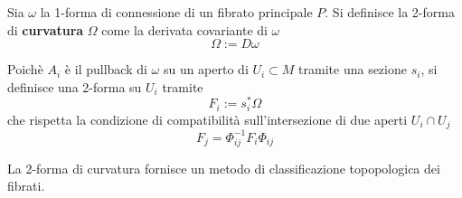 \begin{definition}
   Sia $\omega$ la 1-forma di connessione di un fibrato principale $P$. Si definisce
   la 2-forma di \textbf{curvatura} $\Omega$ come la derivata covariante di $\omega$
   $$ \Omega := D\omega $$
\end{definition}

Poichè $A_i$ è il pullback di $\omega$ su un aperto di $U_i \subset M$
tramite una sezione $s_i$, si definisce una 2-forma su $U_i$ tramite
\begin{equation} F_i := s_i^* \Omega \end{equation}
che rispetta la condizione di compatibilità sull'intersezione di due aperti
$U_i \cap U_j$
\begin{equation} F_j = \Phi_{ij}^{-1}F_i\Phi_{ij} \end{equation}

La 2-forma di curvatura fornisce un metodo di classificazione topopologica
dei fibrati.
